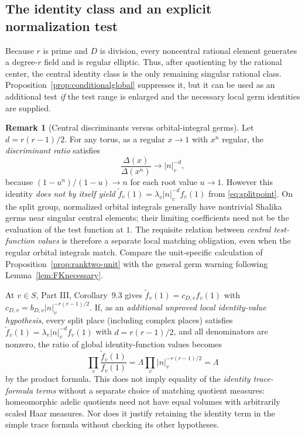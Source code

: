 \documentclass[11pt]{article}
\theoremstyle{plain}
\theoremstyle{definition}
\newtheorem{remark}[theorem]{Remark}
\begin{document}
\subsection{The identity class and an explicit normalization test}
\label{subsec:identity-test}
Because $r$ is prime and $D$ is division, every noncentral
rational element generates a degree-$r$ field and is regular
elliptic.  Thus, after quotienting by the rational center, the
central identity class is the only remaining singular rational
class.  Proposition~\ref{prop:conditionalglobal} suppresses it,
but it can be used as an additional test \emph{if} the test range
is enlarged and the necessary local germ identities are supplied.
\begin{remark}[Central discriminants versus orbital-integral germs]
\label{rem:identity-germs}
Let $d=r(r-1)/2$.  For any torus, as a regular $x\to1$
with $x^n$ regular, the \emph{discriminant ratio} satisfies
\[
 \frac{\Delta(x)}{\Delta(x^n)}\longrightarrow |n|_v^{-d},
\]
because $(1-u^n)/(1-u)\to n$ for each root value $u\to1$.
However this identity \emph{does not by itself yield}
$\widetilde f_v(1)=\lambda_v|n|_v^{-d}f_v(1)$
from \eqref{eq:splitpoint}.  On the split group, normalized
orbital integrals generally have nontrivial Shalika germs near
singular central elements; their limiting coefficients need not
be the evaluation of the test function at $1$.  The requisite
relation between \emph{central test-function values} is therefore
a separate local matching obligation, even when the regular
orbital integrals match.  Compare the unit-specific calculation
of Proposition~\ref{prop:ranktwo-unit} with the general
germ warning following Lemma~\ref{lem:FKnecessary}.
\end{remark}

At $v\in S$, Part III, Corollary~9.3 gives
$\widetilde f_v(1)=c_{D,v}f_v(1)$ with
$c_{D,v}=b_{D,v}|n|_v^{-r(r-1)/2}$.  If, as an \emph{additional unproved local identity-value
hypothesis}, every split place (including complex places) satisfies
$\widetilde f_v(1)=\lambda_v|n|_v^{-d}f_v(1)$ with
$d=r(r-1)/2$, and all denominators are nonzero, the ratio of
global identity-function values becomes
\begin{equation}\label{eq:identityproduct}
 \prod_v\frac{\widetilde f_v(1)}{f_v(1)}
   =\Lambda\prod_v|n|_v^{-r(r-1)/2}
   =\Lambda
\end{equation}
by the product formula.  This does not imply equality of the
\emph{identity trace-formula terms} without a separate choice of
matching quotient measures: homeomorphic adelic quotients need
not have equal volumes with arbitrarily scaled Haar measures.
Nor does it justify retaining the identity term in the simple
trace formula without checking its other hypotheses.
\end{document}
